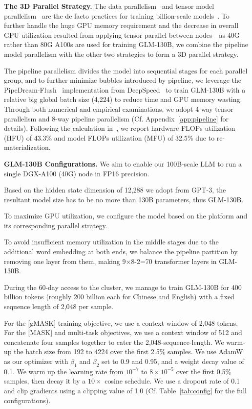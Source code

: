 \textbf{The 3D Parallel Strategy.} The data parallelism~\citep{valiant1990bridging} and tensor model parallelism~\citep{shoeybi2019megatron} are the de facto practices for training billion-scale models~\citep{gpt-j,du2022glm}. To further handle the huge GPU memory requirement and the decrease in overall GPU utilization resulted from applying tensor parallel between nodes---as 40G rather than 80G A100s are used for training GLM-130B, we combine the pipeline model parallelism with the other two strategies to form a 3D parallel strategy. 

The pipeline parallelism divides the model into sequential stages for each parallel group, and to further minimize bubbles introduced by pipeline, we leverage the PipeDream-Flush~\citep{narayanan2021memory} implementation from DeepSpeed~\citep{rasley2020deepspeed} to train GLM-130B with a relative big global batch size (4,224) to reduce time and GPU memory wasting. Through both numerical and empirical examinations, we adopt 4-way tensor parallelism and 8-way pipeline parallelism (Cf. Appendix~\ref{app:pipeline} for details). Following the calculation in~\citep{chowdhery2022palm}, we report hardware FLOPs utilization (HFU) of 43.3\% and model FLOPs utilization (MFU) of 32.5\% due to re-materialization.

\textbf{GLM-130B Configurations.} We aim to enable our 100B-scale LLM to run a single DGX-A100 (40G) node in FP16 precision. 

Based on the hidden state dimension of 12,288 we adopt from GPT-3, the resultant model size has to be no more than 130B parameters, thus GLM-130B.

To maximize GPU utilization, we configure the model based on the platform and its corresponding parallel strategy. 

To avoid insufficient memory utilization in the middle stages due to the additional word embedding at both ends, we balance the pipeline partition by removing one layer from them, making 9$\times$8-2=70 transformer layers in GLM-130B.

During the 60-day access to the cluster, we manage to train GLM-130B for 400 billion tokens (roughly 200 billion each for Chinese and English) with a fixed sequence length of 2,048 per sample. 

For the [gMASK] training objective, we use a context window of 2,048 tokens. For the [MASK] and multi-task objectives, we use a context window of 512 and concatenate four samples together to cater the 2,048-sequence-length. We warm-up the batch size from 192 to 4224 over the first 2.5\% samples. We use AdamW~\citep{loshchilov2017decoupled} as our optimizer with $\beta_1$ and $\beta_2$ set to 0.9 and 0.95, and a weight decay value of 0.1. We warm up the learning rate from $10^{-7}$ to $8\times 10^{-5}$ over the first 0.5\% samples, then decay it by a $10\times$ cosine schedule. We use a dropout rate of 0.1 and clip gradients using a clipping value of 1.0 (Cf. Table~\ref{tab:config} for the full configurations).

